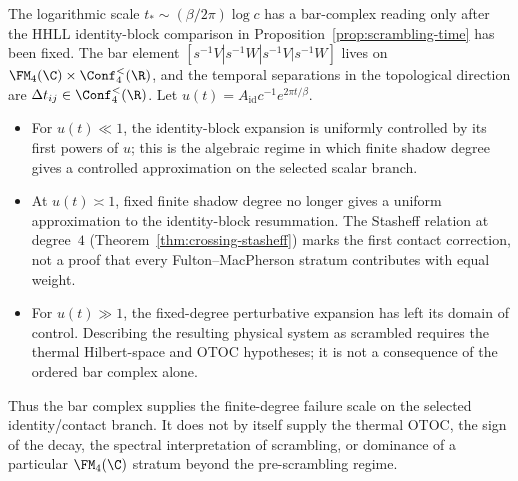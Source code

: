 \begin{remark}
\label{rem:scrambling-bar-interpretation}%
%
The logarithmic scale \(t_*\sim(\beta/2\pi)\log c\) has a
bar-complex reading only after the HHLL identity-block comparison in
Proposition~\ref{prop:scrambling-time} has been fixed.  The bar element
\([s^{-1}V|s^{-1}W|s^{-1}V|s^{-1}W]\) lives on
\(\FM_4(\C)\times\Conf_4^<(\R)\), and the temporal separations in the
topological direction are
\(\Delta t_{ij}\in\Conf_4^<(\R)\).  Let
\(u(t)=A_{\mathrm{id}}c^{-1}e^{2\pi t/\beta}\).
\begin{itemize}
\item For \(u(t)\ll1\), the identity-block expansion is uniformly
 controlled by its first powers of \(u\); this is the algebraic regime
 in which finite shadow degree gives a controlled approximation on the
 selected scalar branch.
\item At \(u(t)\asymp1\), fixed finite shadow degree no longer gives a
 uniform approximation to the identity-block resummation.  The
 Stasheff relation at degree~\(4\)
 \textup{(}Theorem~\ref{thm:crossing-stasheff}\textup{)}
 marks the first contact correction, not a proof that every
 Fulton--MacPherson stratum contributes with equal weight.
\item For \(u(t)\gg1\), the fixed-degree perturbative expansion has
 left its domain of control.  Describing the resulting physical system
 as scrambled requires the thermal Hilbert-space and OTOC hypotheses;
 it is not a consequence of the ordered bar complex alone.
\end{itemize}
Thus the bar complex supplies the finite-degree failure scale on the
selected identity/contact branch.  It does not by itself supply the
thermal OTOC, the sign of the decay, the spectral interpretation of
scrambling, or dominance of a particular \(\FM_4(\C)\) stratum beyond
the pre-scrambling regime.
\end{remark}

